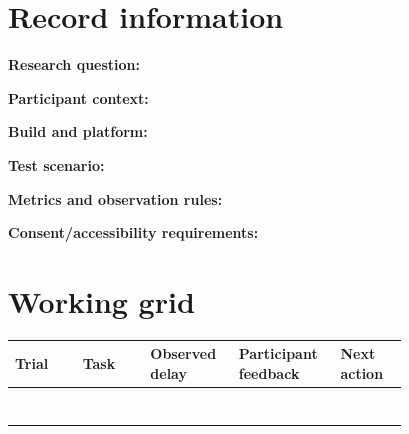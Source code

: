 \documentclass[10pt,letterpaper]{article}
\begin{document}
\makedoctitle
\makedocsummary

\section{Record information}
\noindent\textbf{Research question:}\quad\hrulefill\par\vspace{10pt}
\noindent\textbf{Participant context:}\quad\hrulefill\par\vspace{10pt}
\noindent\textbf{Build and platform:}\quad\hrulefill\par\vspace{10pt}
\noindent\textbf{Test scenario:}\quad\hrulefill\par\vspace{10pt}
\noindent\textbf{Metrics and observation rules:}\quad\hrulefill\par\vspace{10pt}
\noindent\textbf{Consent/accessibility requirements:}\quad\hrulefill\par\vspace{10pt}\section{Working grid}
\begin{longtable}{|p{0.156\linewidth}|p{0.156\linewidth}|p{0.156\linewidth}|p{0.156\linewidth}|p{0.156\linewidth}|}
\hline
\textbf{Trial} & \textbf{Task} & \textbf{Observed delay} & \textbf{Participant feedback} & \textbf{Next action}\\\hline
\endhead
\rule{0pt}{20pt} &  &  &  & \\\hline
\rule{0pt}{20pt} &  &  &  & \\\hline
\rule{0pt}{20pt} &  &  &  & \\\hline
\rule{0pt}{20pt} &  &  &  & \\\hline
\rule{0pt}{20pt} &  &  &  & \\\hline
\rule{0pt}{20pt} &  &  &  & \\\hline
\rule{0pt}{20pt} &  &  &  & \\\hline
\end{longtable}
\end{document}
